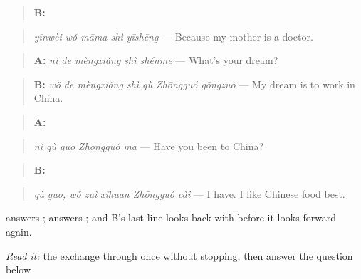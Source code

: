 \begin{quote}
\textbf{B:} 
\end{quote}

\begin{quote}
\emph{yīnwèi wǒ māma shì yīshēng} — Because my mother is a doctor.
\end{quote}

\begin{quote}
\textbf{A:} \emph{nǐ de mèngxiǎng shì shénme} — What's your dream?
\end{quote}

\begin{quote}
\textbf{B:} \emph{wǒ de mèngxiǎng shì qù Zhōngguó gōngzuò} — My dream is to work in China.
\end{quote}

\begin{quote}
\textbf{A:} 
\end{quote}

\begin{quote}
\emph{nǐ qù guo Zhōngguó ma} — Have you been to China?
\end{quote}

\begin{quote}
\textbf{B:}  
\end{quote}

\begin{quote}
\emph{qù guo, wǒ zuì xǐhuan Zhōngguó cài} — I have. I like Chinese food best.
\end{quote}

 answers ;  answers ; and B's last line looks back with  before it looks forward again.

\begin{tcolorbox}[breakable,skin=enhanced,colback=orange!6,colframe=orange!45!black,boxrule=0.5pt,arc=1mm,left=6pt,right=6pt,top=4pt,bottom=4pt,fonttitle=\bfseries,title={Read this}]
\emph{Read it:} the exchange through once without stopping, then answer the question below
\end{tcolorbox}

